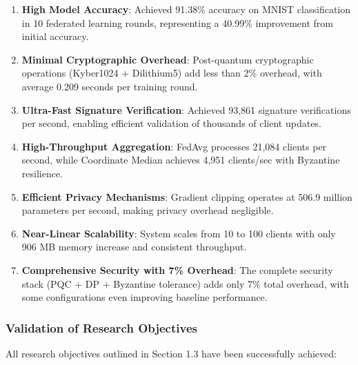 \documentclass[12pt,a4paper]{article}
\begin{document}
\begin{enumerate}
    \item \textbf{High Model Accuracy}: Achieved 91.38\% accuracy on MNIST classification in 10 federated learning rounds, representing a 40.99\% improvement from initial accuracy.
    
    \item \textbf{Minimal Cryptographic Overhead}: Post-quantum cryptographic operations (Kyber1024 + Dilithium5) add less than 2\% overhead, with average 0.209 seconds per training round.
    
    \item \textbf{Ultra-Fast Signature Verification}: Achieved 93,861 signature verifications per second, enabling efficient validation of thousands of client updates.
    
    \item \textbf{High-Throughput Aggregation}: FedAvg processes 21,084 clients per second, while Coordinate Median achieves 4,951 clients/sec with Byzantine resilience.
    
    \item \textbf{Efficient Privacy Mechanisms}: Gradient clipping operates at 506.9 million parameters per second, making privacy overhead negligible.
    
    \item \textbf{Near-Linear Scalability}: System scales from 10 to 100 clients with only 906 MB memory increase and consistent throughput.
    
    \item \textbf{Comprehensive Security with 7\% Overhead}: The complete security stack (PQC + DP + Byzantine tolerance) adds only 7\% total overhead, with some configurations even improving baseline performance.
\end{enumerate}

\subsubsection{Validation of Research Objectives}

All research objectives outlined in Section 1.3 have been successfully achieved:
\end{document}
